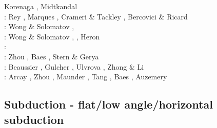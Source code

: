 \begin{scriptsize}
                      Korenaga \cite{kore13}, Midtkandal \etal \cite{mibg13}\\
\twothousandfourteen: Rey \etal \cite{recf14}, Marques \etal \cite{macg14},
                      Crameri \& Tackley \cite{crta14}, Bercovici \& Ricard \cite{beri14}\\
\twothousandfifteen: Wong \& Solomatov \cite{woso15}, \cite{matv15}
                     \cite{pebu15}\cite{vapm15}\cite{legu15}\cite{gesb15}\\
\twothousandsixteen: Wong \& Solomatov \cite{woso16a}, \cite{crta16}
                     \cite{maka16}\cite{bags16}, 
                     Heron \etal \cite{heps16}\\
\twothousandseventeen: \cite{magm17}\\
\twothousandeighteen: Zhou \etal \cite{zhlg18}, Baes \etal \cite{basq18}, Stern \& Gerya \cite{stge18} \\
\twothousandnineteen: Beaussier \etal \cite{begb19}, Gulcher \etal \cite{gubg19}, 
                      Ulvrova \etal \cite{ulcw19}, Zhong \& Li \cite{zhli19}\\
\twothousandtwenty: Arcay \etal \cite{arla20}, Zhou \etal \cite{zhlg20}, 
                    Maunder \etal \cite{mapg20}, Tang \etal \cite{tawm20}, 
                    Baes \etal \cite{basg20b}, Auzemery \etal \cite{auwy20}
\end{scriptsize}

\subsection{Subduction - flat/low angle/horizontal subduction}

